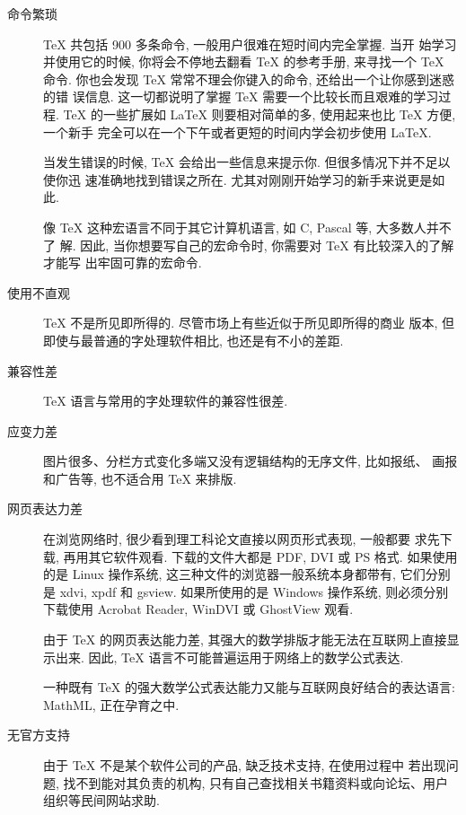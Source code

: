 \begin{description}
  \item[命令繁琐] \TeX{}\index{\TeX} 共包括 900 多条命令, 一般用户很难在短时间内完全掌握. 当开
       始学习并使用它的时候, 你将会不停地去翻看 \TeX{}\index{\TeX} 的参考手册, 来寻找一个 \TeX{}\index{\TeX}
       命令. 你也会发现 \TeX{}\index{\TeX} 常常不理会你键入的命令, 还给出一个让你感到迷惑的错
       误信息. 这一切都说明了掌握 \TeX{}\index{\TeX} 需要一个比较长而且艰难的学习过程. \TeX{}\index{\TeX}
       的一些扩展如 \LaTeX{} \index{\LaTeX} 则要相对简单的多, 使用起来也比 \TeX{} \index{\TeX} 方便, 一个新手
       完全可以在一个下午或者更短的时间内学会初步使用 \LaTeX\index{\LaTeX}.

       当发生错误的时候, \TeX{} \index{\TeX} 会给出一些信息来提示你. 但很多情况下并不足以使你迅
       速准确地找到错误之所在. 尤其对刚刚开始学习的新手来说更是如此.

       像 \TeX{}\index{\TeX} 这种宏语言不同于其它计算机语言, 如 C, Pascal 等, 大多数人并不了
       解. 因此, 当你想要写自己的宏命令时, 你需要对 \TeX{}\index{\TeX} 有比较深入的了解才能写
       出牢固可靠的宏命令.
  \item[使用不直观] \TeX{}\index{\TeX} 不是所见即所得的. 尽管市场上有些近似于所见即所得的商业
       版本, 但即使与最普通的字处理软件相比, 也还是有不小的差距.
  \item[兼容性差] \TeX{}\index{\TeX} 语言与常用的字处理软件的兼容性很差.
  \item[应变力差] 图片很多、分栏方式变化多端又没有逻辑结构的无序文件, 比如报纸、
       画报和广告等, 也不适合用 \TeX{}\index{\TeX} 来排版.
  \item[网页表达力差] 在浏览网络时, 很少看到理工科论文直接以网页形式表现, 一般都要
       求先下载, 再用其它软件观看. 下载的文件大都是 PDF, DVI 或 PS 格式. 如果使用
       的是 Linux 操作系统, 这三种文件的浏览器一般系统本身都带有, 它们分别是 xdvi,
       xpdf 和 gsview. 如果所使用的是 Windows 操作系统, 则必须分别下载使用 Acrobat
       Reader, WinDVI 或 GhostView 观看.

       由于 \TeX{}\index{\TeX} 的网页表达能力差, 其强大的数学排版才能无法在互联网上直接显示出来.
       因此, \TeX{}\index{\TeX} 语言不可能普遍运用于网络上的数学公式表达.

       一种既有 \TeX{}\index{\TeX} 的强大数学公式表达能力又能与互联网良好结合的表达语言: MathML,
       正在孕育之中.
  \item[无官方支持] 由于 \TeX{}\index{\TeX} 不是某个软件公司的产品, 缺乏技术支持, 在使用过程中
       若出现问题, 找不到能对其负责的机构, 只有自己查找相关书籍资料或向论坛、用户
       组织等民间网站求助.
\end{description} 